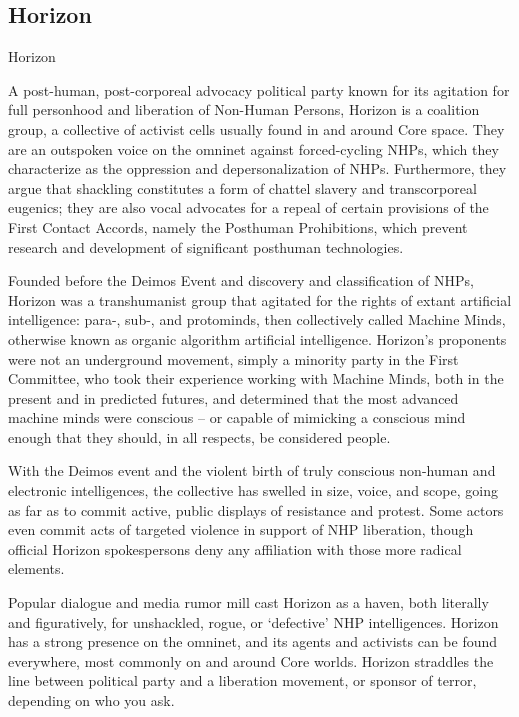 \subsection{Horizon}
Horizon

A post-human, post-corporeal advocacy political party known for its agitation for full personhood
and liberation of Non-Human Persons, Horizon is a coalition group, a collective of activist cells
usually found in and around Core space. They are an outspoken voice on the omninet against
forced-cycling NHPs, which they characterize as the oppression and depersonalization of NHPs.
Furthermore, they argue that shackling constitutes a form of chattel slavery and transcorporeal
eugenics; they are also vocal advocates for a repeal of certain provisions of the First Contact
Accords, namely the Posthuman Prohibitions, which prevent research and development of
significant posthuman technologies.


Founded before the Deimos Event and discovery and classification of NHPs, Horizon was a
transhumanist group that agitated for the rights of extant artificial intelligence: para-, sub-, and
protominds, then collectively called Machine Minds, otherwise known as organic algorithm
artificial intelligence. Horizon’s proponents were not an underground movement, simply a
minority party in the First Committee, who took their experience working with Machine Minds,
both in the present and in predicted futures, and determined that the most advanced machine
minds were conscious -- or capable of mimicking a conscious mind enough that they should, in
all respects, be considered people.





With the Deimos event and the violent birth of truly conscious non-human and electronic
intelligences, the collective has swelled in size, voice, and scope, going as far as to commit
active, public displays of resistance and protest. Some actors even commit acts of targeted
violence in support of NHP liberation, though official Horizon spokespersons deny any affiliation
with those more radical elements.


Popular dialogue and media rumor mill cast Horizon as a haven, both literally and figuratively, for
unshackled, rogue, or ‘defective’ NHP intelligences. Horizon has a strong presence on the
omninet, and its agents and activists can be found everywhere, most commonly on and around
Core worlds. Horizon straddles the line between political party and a liberation movement, or
sponsor of terror, depending on who you ask.


